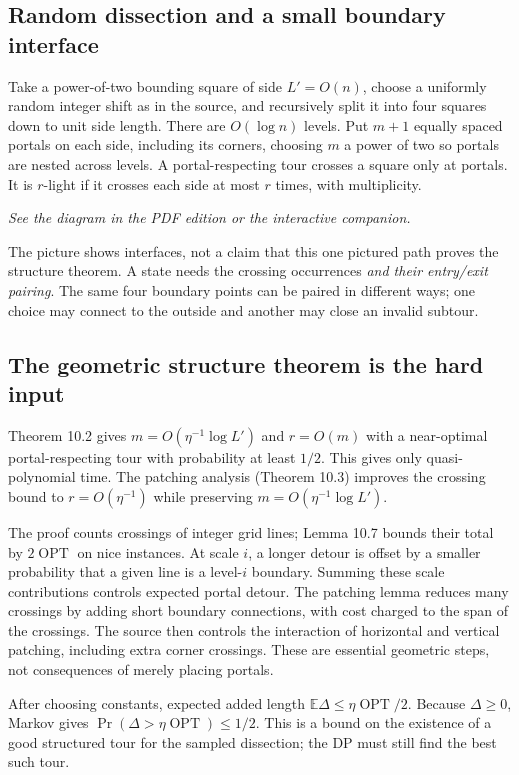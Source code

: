 \documentclass[11pt,a4paper]{article}
\newcommand{\OPT}{\operatorname{OPT}}
\newcommand{\E}{\mathbb E}
\newcommand{\1}{\mathbf 1}
\begin{document}
\subsection{Random dissection and a small boundary interface}
Take a power-of-two bounding square of side $L'=O(n)$, choose a uniformly random
integer shift as in the source, and recursively split it into four squares down
to unit side length. There are $O(\log n)$ levels. Put $m+1$ equally spaced
portals on each side, including its corners, choosing $m$ a power of two so
portals are nested across levels.
A portal-respecting tour crosses a square only at portals. It is $r$-light if
it crosses each side at most $r$ times, with multiplicity.
\begin{center}\emph{See the diagram in the PDF edition or the interactive companion.}\end{center}
The picture shows interfaces, not a claim that this one pictured path proves the
structure theorem. A state needs the crossing occurrences \emph{and their
entry/exit pairing}. The same four boundary points can be paired in different
ways; one choice may connect to the outside and another may close an invalid subtour.
\subsection{The geometric structure theorem is the hard input}
Theorem 10.2 gives $m=O(\eta^{-1}\log L')$ and $r=O(m)$ with a
near-optimal portal-respecting tour with probability at least $1/2$.
This gives only quasi-polynomial time. The patching analysis (Theorem 10.3)
improves the crossing bound to $r=O(\eta^{-1})$ while preserving
$m=O(\eta^{-1}\log L')$.

The proof counts crossings of integer grid lines; Lemma 10.7 bounds their total
by $2\OPT$ on nice instances. At scale $i$, a longer detour is offset by a
smaller probability that a given line is a level-$i$ boundary. Summing these
scale contributions controls expected portal detour. The patching lemma
reduces many crossings by adding short boundary connections, with cost charged
to the span of the crossings. The source then controls the interaction of
horizontal and vertical patching, including extra corner crossings.
These are essential geometric steps, not consequences of merely placing portals.

After choosing constants, expected added length $\E\Delta\le\eta\OPT/2$.
Because $\Delta\ge0$, Markov gives
$\Pr(\Delta>\eta\OPT)\le1/2$.
This is a bound on the existence of a good structured tour for the sampled
dissection; the DP must still find the best such tour.
\end{document}

